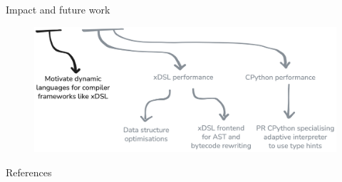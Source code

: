 \documentclass[10pt,aspectratio=169]{beamer}
\begin{document}
\begin{frame}{Impact and future work}
    \begin{figure}[H]
        \hspace*{-1cm}
        \includegraphics[width=\textwidth]{images/impact_future_work.png}
        \vspace{2cm}
    \end{figure}
\end{frame}


\appendix

\maketitle

\begin{frame}[allowframebreaks]{References}
    \printbibliography[heading=none]
\end{frame}
\end{document}
